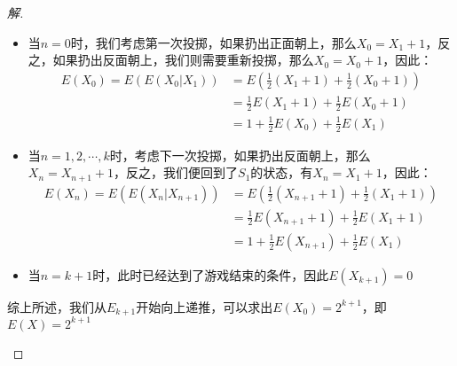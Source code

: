 \documentclass[12pt]{article}
\begin{document}
\begin{enumerate}
\begin{proof}[解]
\begin{enumerate}
		\begin{itemize}
		\item 当$n=0$时，我们考虑第一次投掷，如果扔出正面朝上，那么$X_0=X_1+1$，反之，如果扔出反面朝上，我们则需要重新投掷，那么$X_0=X_0+1$，因此：
		\begin{equation}
		\begin{aligned}
		E(X_0)=E(E(X_0|X_1))&=E\left(\frac{1}{2}(X_1+1)+\frac{1}{2}(X_0+1)\right)\\
		&=\frac{1}{2}E(X_1+1)+\frac{1}{2}E(X_0+1)\\
		&=1+\frac{1}{2}E(X_0)+\frac{1}{2}E(X_1)
		\end{aligned}
		\end{equation}
		\item 当$n=1,2,\cdots,k$时，考虑下一次投掷，如果扔出反面朝上，那么$X_n=X_{n+1}+1$，反之，我们便回到了$S_1$的状态，有$X_n=X_1+1$，因此：
		\begin{equation}
		\begin{aligned}
		E(X_n)=E(E(X_n|X_{n+1}))&=E\left(\frac{1}{2}(X_{n+1}+1)+\frac{1}{2}(X_1+1)\right)\\
		&=\frac{1}{2}E(X_{n+1}+1)+\frac{1}{2}E(X_1+1)\\
		&=1+\frac{1}{2}E(X_{n+1})+\frac{1}{2}E(X_1)
		\end{aligned}
		\end{equation}
		\item 当$n=k+1$时，此时已经达到了游戏结束的条件，因此$E(X_{k+1})=0$
		\end{itemize}
	综上所述，我们从$E_{k+1}$开始向上递推，可以求出$E(X_0)=2^{k+1}$，即$E(X)=2^{k+1}$
	\end{enumerate}
\end{proof}


\end{enumerate}
\end{document}
